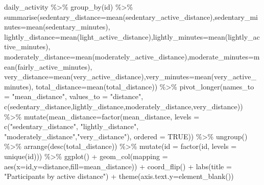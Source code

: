 \documentclass[
]{article}
\newenvironment{Shaded}{\begin{snugshade}}{\end{snugshade}}
\newcommand{\AttributeTok}[1]{\textcolor[rgb]{0.77,0.63,0.00}{#1}}
\newcommand{\ConstantTok}[1]{\textcolor[rgb]{0.00,0.00,0.00}{#1}}
\newcommand{\FunctionTok}[1]{\textcolor[rgb]{0.00,0.00,0.00}{#1}}
\newcommand{\NormalTok}[1]{#1}
\newcommand{\SpecialCharTok}[1]{\textcolor[rgb]{0.00,0.00,0.00}{#1}}
\newcommand{\StringTok}[1]{\textcolor[rgb]{0.31,0.60,0.02}{#1}}
\begin{document}
\begin{Shaded}
\begin{Highlighting}[]
\NormalTok{daily\_activity }\SpecialCharTok{\%\textgreater{}\%}
  \FunctionTok{group\_by}\NormalTok{(id) }\SpecialCharTok{\%\textgreater{}\%}
  \FunctionTok{summarise}\NormalTok{(}\AttributeTok{sedentary\_distance=}\FunctionTok{mean}\NormalTok{(sedentary\_active\_distance),}\AttributeTok{sedentary\_minutes=}\FunctionTok{mean}\NormalTok{(sedentary\_minutes),}
            \AttributeTok{lightly\_distance=}\FunctionTok{mean}\NormalTok{(light\_active\_distance),}\AttributeTok{lightly\_minutes=}\FunctionTok{mean}\NormalTok{(lightly\_active\_minutes),}
            \AttributeTok{moderately\_distance=}\FunctionTok{mean}\NormalTok{(moderately\_active\_distance),}\AttributeTok{moderate\_minutes=}\FunctionTok{mean}\NormalTok{(fairly\_active\_minutes),}
            \AttributeTok{very\_distance=}\FunctionTok{mean}\NormalTok{(very\_active\_distance),}\AttributeTok{very\_minutes=}\FunctionTok{mean}\NormalTok{(very\_active\_minutes),}
            \AttributeTok{total\_distance=}\FunctionTok{mean}\NormalTok{(total\_distance)) }\SpecialCharTok{\%\textgreater{}\%}
  \FunctionTok{pivot\_longer}\NormalTok{(}\AttributeTok{names\_to =} \StringTok{"mean\_distance"}\NormalTok{, }
               \AttributeTok{values\_to =} \StringTok{"distance"}\NormalTok{, }
               \FunctionTok{c}\NormalTok{(sedentary\_distance,lightly\_distance,moderately\_distance,very\_distance)) }\SpecialCharTok{\%\textgreater{}\%}
  \FunctionTok{mutate}\NormalTok{(}\AttributeTok{mean\_distance=}\FunctionTok{factor}\NormalTok{(mean\_distance, }
                              \AttributeTok{levels =} \FunctionTok{c}\NormalTok{(}\StringTok{"sedentary\_distance"}\NormalTok{, }\StringTok{"lightly\_distance"}\NormalTok{, }\StringTok{"moderately\_distance"}\NormalTok{,}\StringTok{"very\_distance"}\NormalTok{),}
                              \AttributeTok{ordered =} \ConstantTok{TRUE}\NormalTok{)) }\SpecialCharTok{\%\textgreater{}\%}
  \FunctionTok{ungroup}\NormalTok{() }\SpecialCharTok{\%\textgreater{}\%}
  \FunctionTok{arrange}\NormalTok{(}\FunctionTok{desc}\NormalTok{(total\_distance)) }\SpecialCharTok{\%\textgreater{}\%}
  \FunctionTok{mutate}\NormalTok{(}\AttributeTok{id =} \FunctionTok{factor}\NormalTok{(id, }\AttributeTok{levels =} \FunctionTok{unique}\NormalTok{(id))) }\SpecialCharTok{\%\textgreater{}\%}
  \FunctionTok{ggplot}\NormalTok{() }\SpecialCharTok{+}
  \FunctionTok{geom\_col}\NormalTok{(}\AttributeTok{mapping =} \FunctionTok{aes}\NormalTok{(}\AttributeTok{x=}\NormalTok{id,}\AttributeTok{y=}\NormalTok{distance,}\AttributeTok{fill=}\NormalTok{mean\_distance)) }\SpecialCharTok{+}
  \FunctionTok{coord\_flip}\NormalTok{() }\SpecialCharTok{+} 
  \FunctionTok{labs}\NormalTok{(}\AttributeTok{title =} \StringTok{"Participants by active distance"}\NormalTok{) }\SpecialCharTok{+}
  \FunctionTok{theme}\NormalTok{(}\AttributeTok{axis.text.y=}\FunctionTok{element\_blank}\NormalTok{())}
\end{Highlighting}
\end{Shaded}
\end{document}
